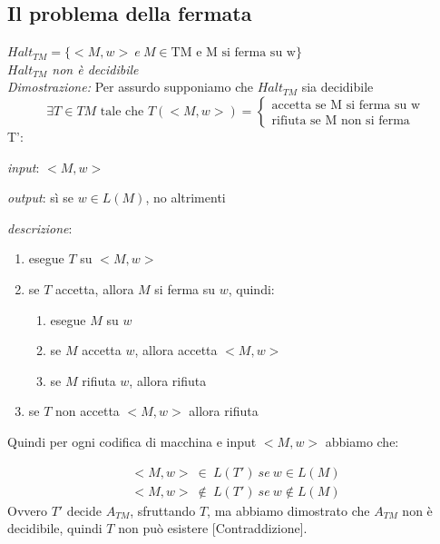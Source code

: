 \subsection{Il problema della fermata}
$Halt_{TM} = \{ <M,w> \ e \ M \in \text{TM e M si ferma su w} \}$ \\
\textit{$Halt_{TM}$ non è decidibile} \\
\textit{Dimostrazione: } Per assurdo supponiamo che $Halt_{TM}$ sia decidibile
\begin{equation*}
	\exists T \in TM \text{ tale che } T(<M,w>) = 
	\begin{cases} 
		\text{accetta se M si ferma su w} \\ 
		\text{rifiuta se M non si ferma}
	\end{cases} 
\end{equation*}
T': 
\begin{description}
\item \textit{input}: $<M, w>$
\item \textit{output}: sì se $w \in L(M)$, no altrimenti
\item \textit{descrizione}:
\begin{enumerate}[label*=\arabic*.]
\item esegue $T$ su $<M,w>$

\item se $T$ accetta, allora $M$ si ferma su $w$, quindi:

\begin{enumerate}[label*=\arabic*.]

\item esegue $M$ su $w$

\item se $M$ accetta $w$, allora accetta $<M,w>$

\item se $M$ rifiuta $w$, allora rifiuta

\end{enumerate}

\item se $T$ non accetta $<M,w>$ allora rifiuta

\end{enumerate}
\end{description}

Quindi per ogni codifica di macchina e input $<M, w>$ abbiamo che:

\begin{gather*}
	<M,w> \ \in \ L(T') \ se \ w \in L(M)\\
	<M,w> \ \notin \ L(T') \ se \ w \notin L(M)
\end{gather*}
Ovvero $T'$ decide $A_{TM}$, sfruttando $T$, ma abbiamo dimostrato che $A_{TM}$ non è decidibile, quindi $T$ non può esistere [Contraddizione].

